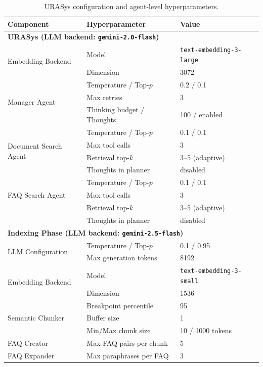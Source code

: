 \documentclass[11pt]{article}
\begin{document}
\begin{table}[!ht]
\centering
\caption{URASys configuration and agent-level hyperparameters.}
\label{tab:urasys-config}
\begin{tabular}{l|l|l}
\toprule
\textbf{Component} & \textbf{Hyperparameter} & \textbf{Value} \\
\midrule
\multicolumn{3}{l}{\textbf{URASys (LLM backend: \texttt{gemini-2.0-flash})}} \\
\midrule

\multirow{2}{*}{Embedding Backend}
 & Model & \texttt{text-embedding-3-large} \\
 & Dimension & 3072 \\
\midrule

\multirow{3}{*}{Manager Agent}
 & Temperature / Top-$p$ & 0.2 / 0.1 \\
 & Max retries & 3 \\
 & Thinking budget / Thoughts & 100 / enabled \\
\midrule

\multirow{4}{*}{Document Search Agent}
 & Temperature / Top-$p$ & 0.1 / 0.1 \\
 & Max tool calls & 3 \\
 & Retrieval top-$k$ & 3--5 (adaptive) \\
& Thoughts in planner & disabled \\
\midrule

\multirow{3}{*}{FAQ Search Agent}
 & Temperature / Top-$p$ & 0.1 / 0.1 \\
 & Max tool calls & 3 \\
 & Retrieval top-$k$ & 3--5 (adaptive) \\
 & Thoughts in planner & disabled \\
\midrule

\multicolumn{3}{l}{\textbf{Indexing Phase (LLM backend: \texttt{gemini-2.5-flash})}} \\
\midrule

\multirow{2}{*}{LLM Configuration}
 & Temperature / Top-$p$ & 0.1 / 0.95 \\
 & Max generation tokens & 8192 \\
\midrule

\multirow{2}{*}{Embedding Backend}
 & Model & \texttt{text-embedding-3-small} \\
 & Dimension & 1536 \\
\midrule

\multirow{3}{*}{Semantic Chunker}
 & Breakpoint percentile & 95 \\
 & Buffer size & 1 \\
 & Min/Max chunk size & 10 / 1000 tokens \\
\midrule

\multirow{1}{*}{FAQ Creator}
 & Max FAQ pairs per chunk & 5 \\
\midrule

\multirow{1}{*}{FAQ Expander}
 & Max paraphrases per FAQ & 3 \\
\bottomrule
\end{tabular}
\end{table}
\end{document}
